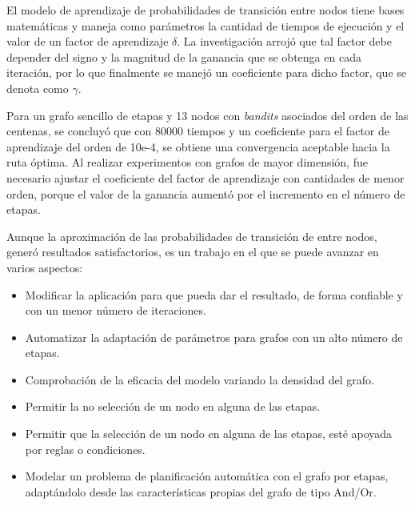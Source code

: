 El modelo de aprendizaje de probabilidades de transición entre nodos tiene bases matemáticas y maneja como parámetros la cantidad de tiempos de ejecución y el valor de un factor de aprendizaje $\delta$. La investigación arrojó que tal factor debe depender del signo y la magnitud de la ganancia que se obtenga en cada iteración, por lo que finalmente se manejó un coeficiente para dicho factor, que se denota como $\gamma$.

Para un grafo sencillo de etapas y 13 nodos con \textit{bandits} asociados del orden de las centenas, se concluyó que con 80000 tiempos y un coeficiente para el factor de aprendizaje del orden de 10e-4, se obtiene una convergencia aceptable hacia la ruta óptima. Al realizar experimentos con grafos de mayor dimensión, fue necesario ajustar el coeficiente del factor de aprendizaje con cantidades de menor orden, porque el valor de la ganancia aumentó por el incremento en el número de etapas.

Aunque la aproximación de las probabilidades de transición de entre nodos, generó resultados satisfactorios, es un trabajo en el que se puede avanzar en varios aspectos:
\begin{itemize}
    \item Modificar la aplicación para que pueda dar el resultado, de forma confiable y con un menor número de iteraciones.    
    \item Automatizar la adaptación de parámetros para grafos con un alto número de etapas.  \item Comprobación de la eficacia del modelo variando la densidad del grafo.    
    \item Permitir la no selección de un nodo en alguna de las etapas.
    \item Permitir que la selección de un nodo en alguna de las etapas, esté apoyada por reglas o condiciones.    
    \item Modelar un problema de planificación automática con el grafo por etapas, adaptándolo desde las características propias del grafo de tipo And/Or.   
\end{itemize} 

